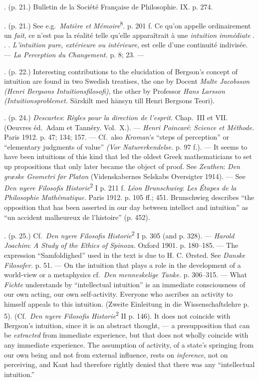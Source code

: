 \documentclass[12pt,a4paper,openany]{book}
\newcommand{\opage}[1]{\marginnote{\footnotesize\textit{[#1]}}}
\newcommand{\notelabel}[1]{\noindent #1}
\begin{document}
\begin{small}
\notelabel{15.} (p. 21.) Bulletin de la Société Française de Philosophie. IX. p. 274.

\notelabel{16.} (p. 21.) See e.g.\ \textit{Matière et Mémoire}\textsuperscript{8}. p. 201 f. Ce qu'on appelle ordinairement un \textit{fait}, ce n'est pas la réalité telle qu'elle apparaîtrait à une \textit{intuition immédiate} . . . \textit{L'intuition pure, extérieure ou intérieure}, est celle d'une continuité indivisée. --- \textit{La Perception du Changement.} p. 8; 23. ---

\notelabel{17.} (p. 22.) Interesting contributions to the elucidation of Bergson's concept of intuition are found in two Swedish treatises, the one by Docent \emph{Malte Jacobsson} \textit{(Henri Bergsons Intuitionsfilosofi)}, the other by Professor \emph{Hans Larsson} \textit{(Intuitionsproblemet.} Särskilt med hänsyn till Henri Bergsons Teori).

\notelabel{18.} (p. 24.) \emph{Descartes}: \textit{Règles pour la direction de l'esprit.} Chap.\ III et VII. (Oeuvres éd.\ Adam et Tannéry. Vol.\ X.). --- \emph{Henri Poincaré}: \textit{Science et Méthode.} Paris 1912. p. 47; 134; 157. --- Cf.\ also \emph{Kroman}'s ``steps of perception'' or ``elementary judgments of value'' \textit{(Vor Naturerkendelse.} p. 97 f.). --- It seems to have been intuitions of this kind that led the oldest Greek mathematicians to set up propositions that only later became the object of proof. See \emph{Zeuthen}: \textit{Den græske Geometri før Platon} (Videnskabernes Selskabs Oversigter 1914). --- See \textit{Den nyere Filosofis Historie}\textsuperscript{2} I p. 211 f. \emph{Léon Brunschwieg}: \textit{Les Étapes de la Philosophie Mathématique.} Paris 1912. p. 105 ff.; 451. Brunschwieg describes ``the opposition that has been asserted in our day between intellect and intuition'' as ``un accident malheureux de l'histoire'' (p. 452). %

\notelabel{19.} (p. 25.) Cf.\ \textit{Den nyere Filosofis Historie}\textsuperscript{2} I p. 305 (and p. 328). --- \emph{Harold Joachim}: \textit{A Study of the Ethics of Spinoza.} Oxford 1901. p. 180--185. --- The expression ``Samfoldighed'' used in the text is due to H. C. Ørsted. See \textit{Danske Filosofer.} p. 51. --- On the intuition that plays a role in the development of a world-view or a metaphysics cf.\ \textit{Den menneskelige Tanke.} p. 306--315. --- What \emph{Fichte} understands by ``intellectual intuition'' is an immediate consciousness of our own acting, our own self-activity. Everyone who ascribes an activity to himself appeals to this intuition. (Zweite Einleitung in die Wissenschaftslehre p. 5). (Cf.\ \textit{Den nyere Filosofis Historie}\textsuperscript{2} II p. 146). It does not coincide with Bergson's intuition, since it is an abstract thought, --- a presupposition that can be \textit{extracted} from immediate experience, but
\opage{68}that does not wholly coincide with any immediate experience. The assumption of activity, of a state's springing from our own being and not from external influence, rests on \textit{inference}, not on perceiving, and Kant had therefore rightly denied that there was any ``intellectual intuition.''


\end{small}
\end{document}
